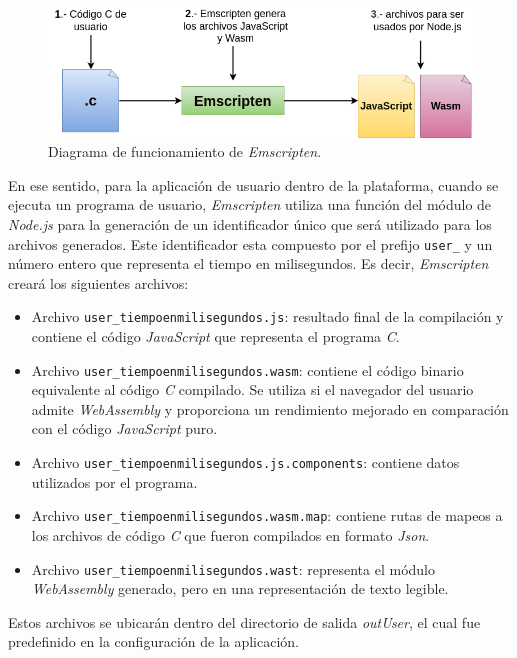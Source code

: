 \begin{figure}[ht]
	\centering
	\includegraphics[scale=.47]{./Figures/Emscripten.png}
	\caption{Diagrama de funcionamiento de \textit{Emscripten}.}
	\label{fig:Emscripten}
\end{figure}

En ese sentido, para la aplicación de usuario dentro de la plataforma, cuando se ejecuta un programa de usuario, \textit{Emscripten} utiliza una función del módulo de \textit{Node.js} para la generación de un identificador único que será utilizado para los archivos generados. Este identificador esta compuesto por el prefijo \texttt{user\_} y un número entero que representa el tiempo en milisegundos. Es decir, \textit{Emscripten} creará los siguientes archivos:

\begin{itemize}
	\item Archivo \texttt{user\_tiempoenmilisegundos.js}: resultado final de la compilación y contiene el código \textit{JavaScript} que representa el programa \textit{C}.
	\item Archivo \texttt{user\_tiempoenmilisegundos.wasm}: contiene el código binario equivalente al código \textit{C} compilado. Se utiliza si el navegador del usuario admite \textit{WebAssembly} y proporciona un rendimiento mejorado en comparación con el código \textit{JavaScript} puro.
	\item Archivo \texttt{user\_tiempoenmilisegundos.js.components}: contiene datos utilizados por el programa.
	\item Archivo \texttt{user\_tiempoenmilisegundos.wasm.map}: contiene rutas de mapeos a los archivos de código \textit{C} que fueron compilados en formato \textit{Json}.
	\item Archivo \texttt{user\_tiempoenmilisegundos.wast}: representa el módulo \textit{WebAssembly} generado, pero en una representación de texto legible.
\end{itemize}

Estos archivos se ubicarán dentro del directorio de salida  \textit{outUser}, el cual fue predefinido en la configuración de la aplicación.

